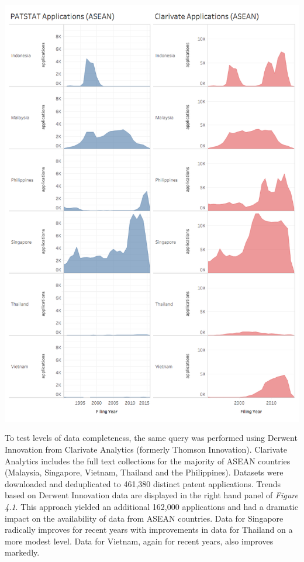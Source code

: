 \documentclass[]{book}
\theoremstyle{definition}
\theoremstyle{definition}
\theoremstyle{definition}
\theoremstyle{remark}
\begin{document}
\begin{center}\includegraphics[width=11.49in]{images/patstat_and_clarivate} \end{center}

To test levels of data completeness, the same query was performed using
Derwent Innovation from Clarivate Analytics (formerly Thomson
Innovation). Clarivate Analytics includes the full text collections for
the majority of ASEAN countries (Malaysia, Singapore, Vietnam, Thailand
and the Philippines). Datasets were downloaded and deduplicated to
461,380 distinct patent applications. Trends based on Derwent Innovation
data are displayed in the right hand panel of \emph{Figure 4.1}. This
approach yielded an additional 162,000 applications and had a dramatic
impact on the availability of data from ASEAN countries. Data for
Singapore radically improves for recent years with improvements in data
for Thailand on a more modest level. Data for Vietnam, again for recent
years, also improves markedly.
\end{document}
